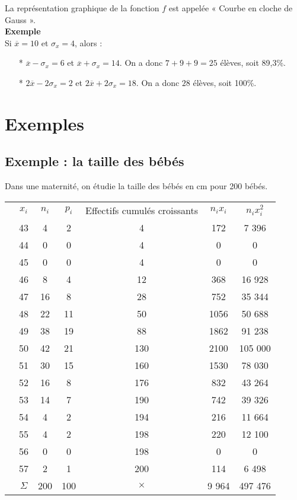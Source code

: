 La représentation graphique de la fonction $f$ est appelée « Courbe en cloche de Gauss ». \\

\textbf{Exemple} \\

Si $\overline{x} = 10$ et $ \sigma_x = 4$, alors :

\begin{itemize}
\item[*] $\overline{x} - \sigma_x = 6$ et $\overline{x} + \sigma_x = 14$. On a donc $7 + 9 + 9 = 25$ élèves, soit 89,3\%. 
\item[*] $2\overline{x} - 2\sigma_x = 2$ et $2\overline{x} + 2\sigma_x = 18$. On a donc $28$ élèves, soit 100\%. 
\end{itemize}

\newpage

\section{Exemples}

\subsection{Exemple  : la taille des bébés}

Dans une maternité, on étudie la taille des bébés en cm pour 200 bébés. \\

\begin{tabular}{rc|c|c|c|c|c}
 & $x_i$ & $n_i$ & $p_i$ & Effectifs cumulés croissants & $n_ix_i$ & $n_ix_i^2$ \\
\cline{2-7}
& 43 & 4 & 2 & 4 & 172 & 7 396 \\
 & 44 & 0 & 0 & 4 & 0 & 0 \\
 & 45 & 0 & 0 & 4 & 0 & 0 \\
 & 46 & 8 & 4 & 12 & 368 & 16 928 \\
 & 47 & 16 & 8 & 28 & 752 & 35 344 \\
 & 48 & 22 & 11 & 50 & 1056 & 50 688 \\
 & 49 & 38 & 19 & 88 & 1862 & 91 238 \\
 & 50 & 42 & 21 & 130 & 2100 & 105 000 \\
 & 51 & 30 & 15 & 160 & 1530 & 78 030 \\
 & 52 & 16 & 8 & 176 & 832 & 43 264 \\
 & 53 & 14 & 7 & 190 & 742 & 39 326 \\
 & 54 & 4 & 2 & 194 & 216 & 11 664 \\
 & 55 & 4 & 2 & 198 & 220 & 12 100 \\
 & 56 & 0 & 0 & 198 & 0 & 0 \\
& 57 & 2 & 1 & 200 & 114 & 6 498 \\
\cline{2-7}
 & $\Sigma$ & 200 & 100 & {\Large $\times$} & 9 964 & 497 476 \\
\end{tabular}

